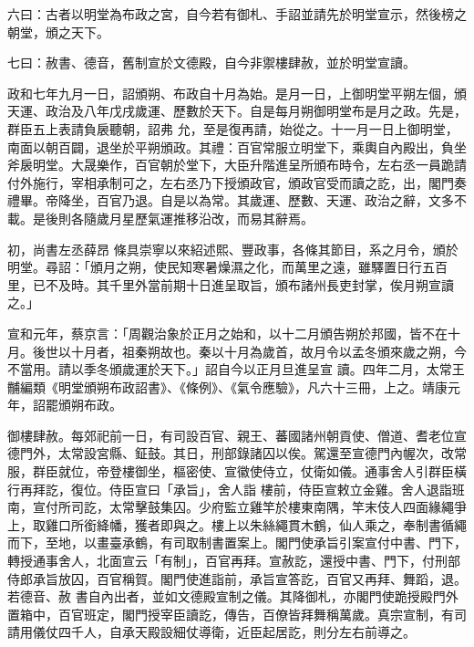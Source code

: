 \begin{pinyinscope}
 六曰：古者以明堂為布政之宮，自今若有御札、手詔並請先於明堂宣示，然後榜之朝堂，頒之天下。



 七曰：赦書、德音，舊制宣於文德殿，自今非禦樓肆赦，並於明堂宣讀。



 政和七年九月一日，詔頒朔、布政自十月為始。是月一日，上御明堂平朔左個，頒天運、政治及八年戊戌歲運、歷數於天下。自是每月朔御明堂布是月之政。先是，群臣五上表請負扆聽朝，詔弗
 允，至是復再請，始從之。十一月一日上御明堂，南面以朝百闢，退坐於平朔頒政。其禮：百官常服立明堂下，乘輿自內殿出，負坐斧扆明堂。大晟樂作，百官朝於堂下，大臣升階進呈所頒布時令，左右丞一員跪請付外施行，宰相承制可之，左右丞乃下授頒政官，頒政官受而讀之訖，出，閣門奏禮畢。帝降坐，百官乃退。自是以為常。其歲運、歷數、天運、政治之辭，文多不載。是後則各隨歲月星歷氣運推移沿改，而易其辭焉。



 初，尚書左丞薛昂
 條具崇寧以來紹述熙、豐政事，各條其節目，系之月令，頒於明堂。尋詔：「頒月之朔，使民知寒暑燥濕之化，而萬里之遠，雖驛置日行五百里，已不及時。其千里外當前期十日進呈取旨，頒布諸州長吏封掌，俟月朔宣讀之。」



 宣和元年，蔡京言：「周觀治象於正月之始和，以十二月頒告朔於邦國，皆不在十月。後世以十月者，祖秦朔故也。秦以十月為歲首，故月令以孟冬頒來歲之朔，今不當用。請以季冬頒歲運於天下。」詔自今以正月旦進呈宣
 讀。四年二月，太常王黼編類《明堂頒朔布政詔書》、《條例》、《氣令應驗》，凡六十三冊，上之。靖康元年，詔罷頒朔布政。



 御樓肆赦。每郊祀前一日，有司設百官、親王、蕃國諸州朝貢使、僧道、耆老位宣德門外，太常設宮縣、鉦鼓。其日，刑部錄諸囚以俟。駕還至宣德門內幄次，改常服，群臣就位，帝登樓御坐，樞密使、宣徽使侍立，仗衛如儀。通事舍人引群臣橫行再拜訖，復位。侍臣宣曰「承旨」，舍人詣
 樓前，侍臣宣敕立金雞。舍人退詣班南，宣付所司訖，太常擊鼓集囚。少府監立雞竿於樓東南隅，竿末伎人四面緣繩爭上，取雞口所銜絳幡，獲者即與之。樓上以朱絲繩貫木鶴，仙人乘之，奉制書循繩而下，至地，以畫臺承鶴，有司取制書置案上。閣門使承旨引案宣付中書、門下，轉授通事舍人，北面宣云「有制」，百官再拜。宣赦訖，還授中書、門下，付刑部侍郎承旨放囚，百官稱賀。閣門使進詣前，承旨宣答訖，百官又再拜、舞蹈，退。若德音、赦
 書自內出者，並如文德殿宣制之儀。其降御札，亦閣門使跪授殿門外置箱中，百官班定，閣門授宰臣讀訖，傳告，百僚皆拜舞稱萬歲。真宗宣制，有司請用儀仗四千人，自承天殿設細仗導衛，近臣起居訖，則分左右前導之。




\end{pinyinscope}
